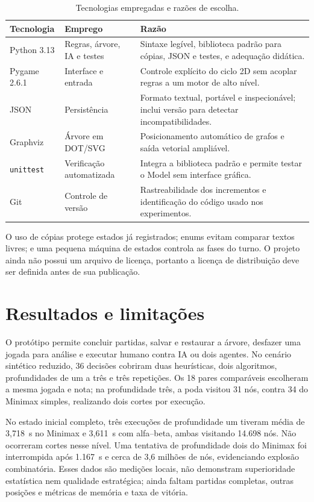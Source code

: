 \documentclass[12pt]{article}
\begin{document}
\begin{table}[ht]
  \centering
  \caption{Tecnologias empregadas e razões de escolha.}
  \label{tab:tecnologias}
  \small
  \begin{tabularx}{\textwidth}{@{}p{}p{}Y@{}}
    \toprule
    \textbf{Tecnologia} & \textbf{Emprego} & \textbf{Razão} \\
    \midrule
    Python 3.13 & Regras, árvore, IA e testes & Sintaxe legível, biblioteca padrão para cópias, JSON e testes, e adequação didática. \\
    Pygame 2.6.1 & Interface e entrada & Controle explícito do ciclo 2D sem acoplar regras a um motor de alto nível. \\
    JSON & Persistência & Formato textual, portável e inspecionável; inclui versão para detectar incompatibilidades. \\
    Graphviz & Árvore em DOT/SVG & Posicionamento automático de grafos e saída vetorial ampliável. \\
    \texttt{unittest} & Verificação automatizada & Integra a biblioteca padrão e permite testar o Model sem interface gráfica. \\
    Git & Controle de versão & Rastreabilidade dos incrementos e identificação do código usado nos experimentos. \\
    \bottomrule
  \end{tabularx}
\end{table}

O uso de cópias protege estados já registrados; enums evitam comparar textos livres; e uma pequena máquina de estados controla as fases do turno. O projeto ainda não possui um arquivo de licença, portanto a licença de distribuição deve ser definida antes de sua publicação.

\section{Resultados e limitações}

O protótipo permite concluir partidas, salvar e restaurar a árvore, desfazer uma jogada para análise e executar humano contra IA ou dois agentes. No cenário sintético reduzido, 36 decisões cobriram duas heurísticas, dois algoritmos, profundidades de um a três e três repetições. Os 18 pares comparáveis escolheram a mesma jogada e nota; na profundidade três, a poda visitou 31 nós, contra 34 do Minimax simples, realizando dois cortes por execução.

No estado inicial completo, três execuções de profundidade um tiveram média de 3,718~s no Minimax e 3,611~s com alfa--beta, ambas visitando 14.698 nós. Não ocorreram cortes nesse nível. Uma tentativa de profundidade dois do Minimax foi interrompida após 1.167~s e cerca de 3,6 milhões de nós, evidenciando explosão combinatória. Esses dados são medições locais, não demonstram superioridade estatística nem qualidade estratégica; ainda faltam partidas completas, outras posições e métricas de memória e taxa de vitória.
\end{document}
